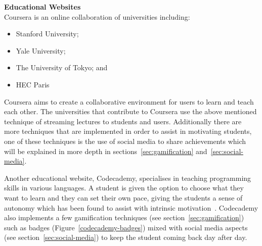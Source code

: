 \documentclass[a4paper,12pt]{article}
\begin{document}
\par
\textbf{Educational Websites}\\ 
Coursera is an online collaboration of universities including: 
\begin{itemize}
	\item{Stanford University;}
	\item{Yale University;}
	\item{The University of Tokyo; and}
	\item{HEC Paris}
\end{itemize}
Coursera aims to create a collaborative environment for users to learn and teach each other. The universities that contribute to Coursera use the above mentioned technique of streaming lectures to students and users. Additionally there are more techniques that are implemented in order to assist in motivating students, one of these techniques is the use of social media to share achievements which will be explained in more depth in sections~\ref{sec:gamification} and~\ref{sec:social-media}.

\par
Another educational website, Codecademy, specialises in teaching programming skills in various languages. A student is given the option to choose what they want to learn and they can set their own pace, giving the students a sense of autonomy which has been found to assist with intrinsic motivation~\citep{bread-and-games}. 
Codecademy also implements a few gamification techniques (see section~\ref{sec:gamification}) such as badges (Figure~\ref{codecademy-badges}) mixed with social media aspects (see section~\ref{sec:social-media}) to keep the student coming back day after day.	
\end{document}
